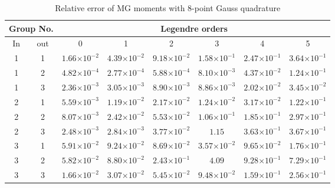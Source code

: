 \documentclass[review]{elsarticle}
\newcommand{\e}[1]{\ensuremath{\times10^{#1}}}
\begin{document}
\begin{table}[h]
\centering
\caption{Relative error of MG moments with 8-point Gauss quadrature}\normalsize
\label{tb:8err}
\begin{adjustwidth}{-0.5cm}{}
\begin{tabular}{|c|c|c|c|c|c|c|c|}
\hline
\multicolumn{2}{|c|}{Group No.} & \multicolumn{6}{c|}{Legendre orders}\\
\hline
In & out & 0 & 1 & 2 & 3 & 4 & 5\\ 
\hline
1 & 1 & \cellcolor{green} $1.66\e{-2}$ & \cellcolor{green} $4.39\e{-2}$ & \cellcolor{green} $9.18\e{-2}$ & \cellcolor{cyan} $1.58\e{-1}$ & \cellcolor{yellow} $2.47\e{-1}$ & \cellcolor{yellow} $3.64\e{-1}$\\
\hline
1 & 2 & \cellcolor{green} $4.82\e{-4}$ & \cellcolor{green} $2.77\e{-4}$ & \cellcolor{green} $5.88\e{-4}$ & \cellcolor{green} $8.10\e{-3}$ & \cellcolor{green} $4.37\e{-2}$ & \cellcolor{cyan} $1.24\e{-1}$\\
\hline
1 & 3 & \cellcolor{green} $2.36\e{-3}$ & \cellcolor{green} $3.05\e{-3}$ & \cellcolor{green} $8.90\e{-3}$ & \cellcolor{green} $8.86\e{-3}$ & \cellcolor{green} $2.02\e{-2}$ & \cellcolor{green} $3.45\e{-2}$\\
\hline
2 & 1 & \cellcolor{green} $5.59\e{-3}$ & \cellcolor{green} $1.19\e{-2}$ & \cellcolor{green} $2.17\e{-2}$ & \cellcolor{green} $1.24\e{-2}$ & \cellcolor{green} $3.17\e{-2}$ & \cellcolor{cyan} $1.22\e{-1}$\\
\hline
2 & 2 & \cellcolor{green} $8.07\e{-3}$ & \cellcolor{green} $2.42\e{-2}$ & \cellcolor{green} $5.53\e{-2}$ & \cellcolor{cyan} $1.06\e{-1}$ & \cellcolor{cyan} $1.85\e{-1}$ & \cellcolor{yellow} $2.97\e{-1}$\\
\hline
2 & 3 & \cellcolor{green} $2.48\e{-3}$ & \cellcolor{green} $2.84\e{-3}$ & \cellcolor{green} $3.77\e{-2}$ & \cellcolor{red} $1.15$ & \cellcolor{yellow} $3.63\e{-1}$ & \cellcolor{yellow} $3.67\e{-1}$\\
\hline
3 & 1 & \cellcolor{green} $5.91\e{-2}$ & \cellcolor{green} $9.24\e{-2}$ & \cellcolor{green} $8.69\e{-2}$ & \cellcolor{green} $3.57\e{-2}$ & \cellcolor{green} $9.65\e{-2}$ & \cellcolor{cyan} $1.76\e{-1}$\\
\hline
3 & 2 & \cellcolor{green} $5.82\e{-2}$ & \cellcolor{green} $8.80\e{-2}$ & \cellcolor{yellow} $2.43\e{-1}$ & \cellcolor{red} $4.09$ & \cellcolor{yellow} $9.28\e{-1}$ & \cellcolor{yellow} $7.29\e{-1}$\\
\hline
3 & 3 & \cellcolor{green} $1.66\e{-2}$ & \cellcolor{green} $3.07\e{-2}$ & \cellcolor{green} $5.45\e{-2}$ & \cellcolor{green} $9.48\e{-2}$ & \cellcolor{cyan} $1.59\e{-1}$ & \cellcolor{yellow} $2.56\e{-1}$\\
\hline
\end{tabular}
\end{adjustwidth}
\end{table}
\end{document}
